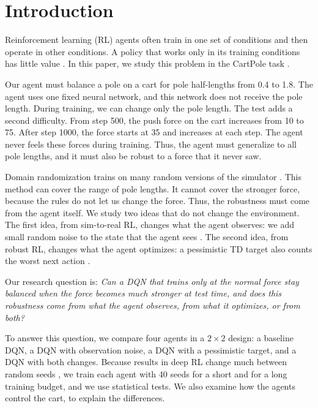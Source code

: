 \documentclass[sigconf]{acmart}
\begin{document}
\section{Introduction}
Reinforcement learning (RL) agents often train in one set of conditions and then operate in other conditions. A policy that works only in its training conditions has little value \cite{packer2018assessing, kirk2023survey}. In this paper, we study this problem in the CartPole task \cite{barto1983neuronlike, brockman2016openai}.

Our agent must balance a pole on a cart for pole half-lengths from 0.4 to 1.8. The agent uses one fixed neural network, and this network does not receive the pole length. During training, we can change only the pole length. The test adds a second difficulty. From step 500, the push force on the cart increases from 10 to 75. After step 1000, the force starts at 35 and increases at each step. The agent never feels these forces during training. Thus, the agent must generalize to all pole lengths, and it must also be robust to a force that it never saw.

Domain randomization trains on many random versions of the simulator \cite{tobin2017domain, peng2018sim}. This method can cover the range of pole lengths. It cannot cover the stronger force, because the rules do not let us change the force. Thus, the robustness must come from the agent itself. We study two ideas that do not change the environment. The first idea, from sim-to-real RL, changes what the agent observes: we add small random noise to the state that the agent sees \cite{peng2018sim, rudin2021learning}. The second idea, from robust RL, changes what the agent optimizes: a pessimistic TD target also counts the worst next action \cite{tessler2019action, klima2019robust}.

Our research question is: \emph{Can a DQN that trains only at the normal force stay balanced when the force becomes much stronger at test time, and does this robustness come from what the agent observes, from what it optimizes, or from both?}

To answer this question, we compare four agents in a $2\times2$ design: a baseline DQN, a DQN with observation noise, a DQN with a pessimistic target, and a DQN with both changes. Because results in deep RL change much between random seeds \cite{henderson2018deep}, we train each agent with 40 seeds for a short and for a long training budget, and we use statistical tests. We also examine how the agents control the cart, to explain the differences.
\end{document}
